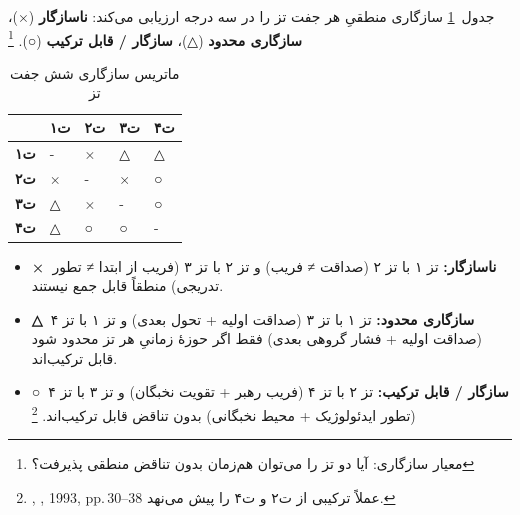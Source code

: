 \documentclass[12pt,a4paper]{book}
\newcommand{\en}[1]{\lr{\textit{#1}}}
\begin{document}
جدول~\ref{tab:compat-matrix} سازگاری منطقیِ هر جفت تز
را در سه درجه ارزیابی می‌کند:
\textbf{ناسازگار} (×)، \textbf{سازگاری محدود} (△)،
\textbf{سازگار / قابل ترکیب} (○).%
\footnote{معیار سازگاری: آیا دو تز را می‌توان
هم‌زمان بدون تناقض منطقی پذیرفت؟}

\begin{table}[ht]
\centering
\caption{ماتریس سازگاری شش جفت تز}
\label{tab:compat-matrix}
\begin{tabular}{>{\centering\arraybackslash}m{2.5cm}
                >{\centering\arraybackslash}m{2cm}
                >{\centering\arraybackslash}m{2cm}
                >{\centering\arraybackslash}m{2cm}
                >{\centering\arraybackslash}m{2cm}}
\toprule
 & \cellcolor{cGreen!20}\textbf{ت‌۱}
 & \cellcolor{cAccent!20}\textbf{ت‌۲}
 & \cellcolor{cGold!20}\textbf{ت‌۳}
 & \cellcolor{cConsolid!20}\textbf{ت‌۴} \\
\midrule
\cellcolor{cGreen!20}\textbf{ت‌۱}
  & -
  & \cellcolor{cAccent!10} ×
  & \cellcolor{cGold!10} △
  & \cellcolor{cConsolid!10} △ \\
\cellcolor{cAccent!20}\textbf{ت‌۲}
  & \cellcolor{cAccent!10} ×
  & -
  & \cellcolor{cGold!10} ×
  & \cellcolor{cConsolid!10} ○ \\
\cellcolor{cGold!20}\textbf{ت‌۳}
  & \cellcolor{cGold!10} △
  & \cellcolor{cAccent!10} ×
  & -
  & \cellcolor{cConsolid!10} ○ \\
\cellcolor{cConsolid!20}\textbf{ت‌۴}
  & \cellcolor{cConsolid!10} △
  & \cellcolor{cAccent!10} ○
  & \cellcolor{cGold!10} ○
  & -  \\
\bottomrule
\end{tabular}
\end{table}

\begin{noteBox}
\begin{itemize}[nosep]
\item \textbf{×\ ناسازگار:}
  تز ۱ با تز ۲ (صداقت ≠ فریب) و تز ۲ با تز ۳
  (فریب از ابتدا ≠ تطور تدریجی) منطقاً قابل جمع نیستند.
\item \textbf{△\ سازگاری محدود:}
  تز ۱ با تز ۳ (صداقت اولیه + تحول بعدی) و
  تز ۱ با تز ۴ (صداقت اولیه + فشار گروهی بعدی)
  فقط اگر حوزهٔ زمانیِ هر تز محدود شود قابل ترکیب‌اند.
\item \textbf{○\ سازگار / قابل ترکیب:}
  تز ۲ با تز ۴ (فریب رهبر + تقویت نخبگان) و
  تز ۳ با تز ۴ (تطور ایدئولوژیک + محیط نخبگانی)
  بدون تناقض قابل ترکیب‌اند.%
  \footnote{%
  \en{Abrahamian},
  \textit{\en{Khomeinism}}, 1993, pp.\,30–38
  عملاً ترکیبی از ت‌۲ و ت‌۴ را پیش می‌نهد.}
\end{itemize}
\end{noteBox}
\end{document}

